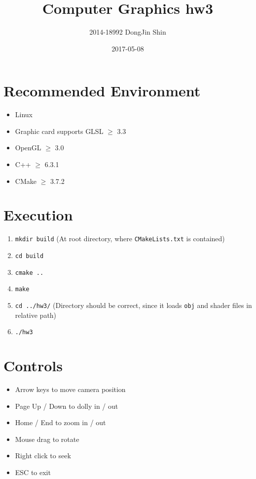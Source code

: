 \documentclass[11pt]{oblivoir}
\title{Computer Graphics hw3}
\date{2017-05-08}
\author{2014-18992 DongJin Shin}
\begin{document}
	
\maketitle

\section{Recommended Environment}

\begin{itemize}
\item Linux
\item Graphic card supports GLSL $\geq$ 3.3
\item OpenGL $\geq$ 3.0
\item C++ $\geq$ 6.3.1
\item CMake $\geq$ 3.7.2
\end{itemize}

\section{Execution}

\begin{enumerate}
\item \verb|mkdir build| (At root directory, where \verb|CMakeLists.txt| is contained)
\item \verb|cd build|
\item \verb|cmake ..|
\item \verb|make|
\item \verb|cd ../hw3/| (Directory should be correct, since it loads \verb|obj| and shader files in relative path)
\item \verb|./hw3|
\end{enumerate}

\section{Controls}
\begin{itemize}
\item Arrow keys to move camera position
\item Page Up / Down to dolly in / out
\item Home / End to zoom in / out
\item Mouse drag to rotate
\item Right click to seek
\item ESC to exit
\end{itemize}
\end{document}
